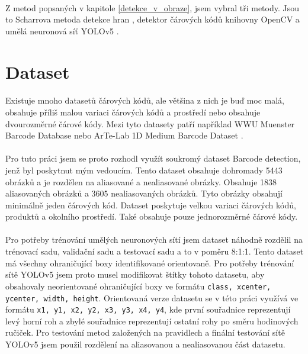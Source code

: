 \paragraph{} Z metod popsaných v kapitole \ref{detekce_v_obraze}, jsem vybral tři metody. Jsou to Scharrova metoda detekce hran \cite{pyimagesearch_barcode_detection}, detektor čárových kódů knihovny OpenCV \cite{opencv_barcode} a umělá neuronová síť YOLOv5 \cite{yolov5_github}.

\section{Dataset}
\label{dataset}
\paragraph{} Existuje mnoho datasetů čárových kódů, ale většina z nich je buď moc malá, obsahuje příliš malou variaci čárových kódů a prostředí nebo obsahuje dvourozměrné čárové kódy. Mezi tyto datasety patří například WWU Muenster Barcode Database \cite{dataset1} nebo ArTe-Lab 1D Medium Barcode Dataset \cite{dataset2}.
\paragraph{} Pro tuto práci jsem se proto rozhodl využít soukromý dataset Barcode detection, jenž byl poskytnut mým vedoucím. Tento dataset obsahuje dohromady 5443 obrázků a je rozdělen na aliasované a nealiasované obrázky. Obsahuje 1838 aliasovaných obrázků a 3605 nealiasovaných obrázků. Tyto obrázky obsahují minimálně jeden čárových kód. Dataset poskytuje velkou variaci čárových kódů, produktů a okolního prostředí. Také obsahuje pouze jednorozměrné čárové kódy.
\paragraph{} Pro potřeby trénování umělých neuronových sítí jsem dataset náhodně rozdělil na trénovací sadu, validační sadu a testovací sadu a to v poměru 8:1:1. Tento dataset má všechny ohraničující boxy identifikované orientovaně. Pro potřeby trénování sítě YOLOv5 jsem proto musel modifikovat štítky tohoto datasetu, aby obsahovaly neorientované ohraničující boxy ve formátu \texttt{class, xcenter, ycenter, width, height}. Orientovaná verze datasetu se v této práci využívá ve formátu \texttt{x1, y1, x2, y2, x3, y3, x4, y4}, kde první souřadnice reprezentují levý horní roh a zbylé souřadnice reprezentují ostatní rohy po směru hodinových ručiček. Pro testování metod založených na pravidlech a finální testování sítě YOLOv5 jsem použil rozdělení na aliasovanou a nealiasovanou část datasetu.
\pagebreak
